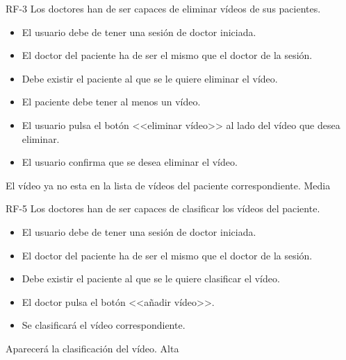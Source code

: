 {RF-3}
{Los doctores han de ser capaces de eliminar vídeos de sus pacientes.}
{	\begin{itemize}
	\def\labelenumi{\arabic{enumi}.}
	\tightlist
	\item El usuario debe de tener una sesión de doctor iniciada.
	\item El doctor del paciente ha de ser el mismo que el doctor de la sesión.
	\item Debe existir el paciente al que se le quiere eliminar el vídeo.
	\item El paciente debe tener al menos un vídeo.
	\end{itemize}}
{
	\begin{itemize}
	\def\labelenumi{\arabic{enumi}.}
	\tightlist
    \item El usuario pulsa el botón <<eliminar vídeo>> al lado del vídeo que desea eliminar.
    \item El usuario confirma que se desea eliminar el vídeo.
    \end{itemize}
}
{El vídeo ya no esta en la lista de vídeos del paciente correspondiente.}
{}
{Media}


{RF-5}
{Los doctores han de ser capaces de clasificar los vídeos del paciente.}
{	\begin{itemize}
	\def\labelenumi{\arabic{enumi}.}
	\tightlist
	\item El usuario debe de tener una sesión de doctor iniciada.
	\item El doctor del paciente ha de ser el mismo que el doctor de la sesión.
	\item Debe existir el paciente al que se le quiere clasificar el vídeo.
	\end{itemize}}
{
	\begin{itemize}
	\def\labelenumi{\arabic{enumi}.}
	\tightlist
    \item El doctor pulsa el botón <<añadir vídeo>>.
    \item Se clasificará el vídeo correspondiente.   
    \end{itemize}
}
{Aparecerá la clasificación del vídeo.}
{}
{Alta}

